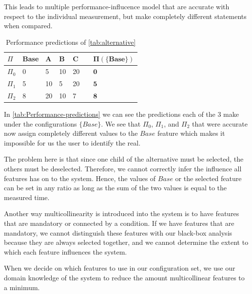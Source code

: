 This leads to multiple performance-influcence model that are accurate with respect to the individual measurement, 
but make completely different statements when compared.

\begin{table}[h]
    \centering
    \begin{tabular}{lllllll}
    \hline
    $\Pi$ & Base & A & B & C   & &  $\bm{\Pi(\{Base\})}$   \\ \hline
    $\Pi_0$ & 0 & 5  & 10 & 20 & &  $\mathbf{0}$         \\
    $\Pi_1$ & 5 & 10 & 5  & 20 & &  $\mathbf{5}$         \\  
    $\Pi_2$ & 8 & 20 & 10 & 7  & &  $\mathbf{8}$        \\\hline
    \end{tabular}
    \caption{Performance predictions of \autoref{tab:alternative}}\label{tab:Performance-predictions}
\end{table}

In \autoref{tab:Performance-predictions} we can see the predictions each of the 3 \perfInfluenceModel make under the configurations
$\{Base\}$. We see that $\Pi_0$, $\Pi_1$, and $\Pi_2$ that were accurate now assign completely different values to the $Base$ feature
which makes it impossible for us the user to identify the real.

The problem here is that since one child of the alternative must be selected, the others must be deselected. Therefore, we cannot correctly infer the influence
all features has on to the system.
Hence, the values of $Base$ or the selected feature can be set in any ratio as long as the sum of the two values is equal to the measured time.

Another way  multicollinearity is introduced into the system is to have features that are mandatory or connected by a condition. 
If we have features that are mandatory, we cannot distinguish these features with our black-box analysis because they are always selected
together, and we cannot determine the extent to which each feature influences the system. \cite{Multicollinearity}

When we decide on which features to use in our configuration set, we use our domain knowledge of the system to reduce the amount multicollinear
features to a minimum.

%
%
%

